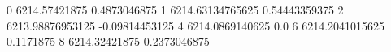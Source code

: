 0 6214.57421875 0.4873046875
1 6214.63134765625 0.54443359375
2 6213.98876953125 -0.09814453125
4 6214.0869140625 0.0
6 6214.2041015625 0.1171875
8 6214.32421875 0.2373046875
